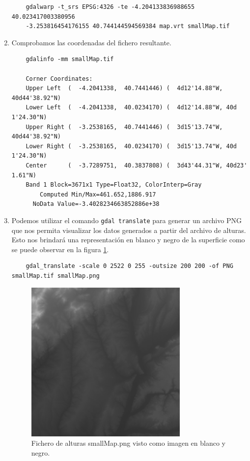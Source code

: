 \documentclass[a4paper, 11pt]{book}
\begin{document}
\begin{enumerate}
    {\scriptsize
    \begin{verbatim}
    gdalwarp -t_srs EPSG:4326 -te -4.204133836988655 40.023417003380956
    -3.253816454176155 40.744144594569384 map.vrt smallMap.tif
    \end{verbatim}
    }

    \item Comprobamos las coordenadas del fichero resultante.

    {\scriptsize
    \begin{verbatim}
    gdalinfo -mm smallMap.tif

    Corner Coordinates:
    Upper Left  (  -4.2041338,  40.7441446) (  4d12'14.88"W, 40d44'38.92"N)
    Lower Left  (  -4.2041338,  40.0234170) (  4d12'14.88"W, 40d 1'24.30"N)
    Upper Right (  -3.2538165,  40.7441446) (  3d15'13.74"W, 40d44'38.92"N)
    Lower Right (  -3.2538165,  40.0234170) (  3d15'13.74"W, 40d 1'24.30"N)
    Center      (  -3.7289751,  40.3837808) (  3d43'44.31"W, 40d23' 1.61"N)
    Band 1 Block=3671x1 Type=Float32, ColorInterp=Gray
        Computed Min/Max=461.652,1886.917
      NoData Value=-3.4028234663852886e+38
    \end{verbatim}
    }
    \item Podemos utilizar el comando \texttt{gdal translate} para generar un archivo \textsc{PNG} que nos permita visualizar los datos generados a partir del archivo de alturas. Esto nos brindará una representación en blanco y negro de la superficie como se puede observar en la figura \ref{fig:demImage}.
    {\scriptsize
    \begin{verbatim}
    gdal_translate -scale 0 2522 0 255 -outsize 200 200 -of PNG smallMap.tif smallMap.png
    \end{verbatim}
    }
    
    \begin{figure}[h]
      \centering
      \includegraphics[width=8cm, keepaspectratio]{img/smallMap.png}
      \caption{Fichero de alturas smallMap.png visto como imagen en blanco y negro.}
      \label{fig:demImage}
    \end{figure}


\end{enumerate}
\end{document}
